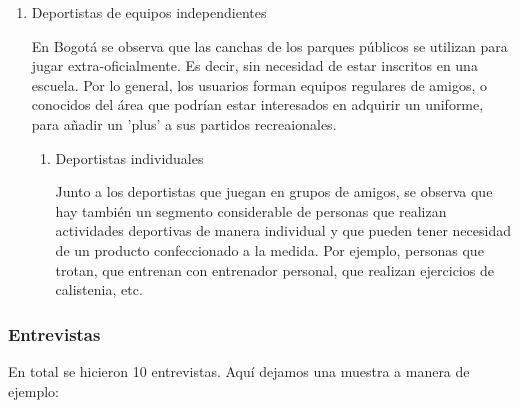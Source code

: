 \documentclass[11pt]{article}
\begin{document}
\begin{enumerate}
\item Deportistas de equipos independientes 

En Bogotá se observa que las
canchas de los parques públicos se utilizan
para jugar extra-oficialmente. Es decir,
sin necesidad de estar inscritos en una
escuela. Por lo general, los usuarios
forman equipos regulares de amigos, o
conocidos del área que podrían estar
interesados en adquirir un uniforme,
para añadir un 'plus' a sus partidos
recreaionales.

\begin{enumerate}
\item Deportistas individuales

Junto a los deportistas que juegan en grupos
de amigos, se observa que hay también un
segmento considerable de personas que
realizan actividades deportivas de manera
individual y que pueden tener necesidad
de un producto confeccionado a la medida.
Por ejemplo, personas que trotan, que
entrenan con entrenador personal, que
realizan ejercicios de calistenia, etc.
\end{enumerate}
\end{enumerate}



\subsubsection{Entrevistas}
\label{sec:orgde70a25}
En total se hicieron 10 entrevistas. Aquí dejamos una
muestra a manera de ejemplo:
\end{document}
